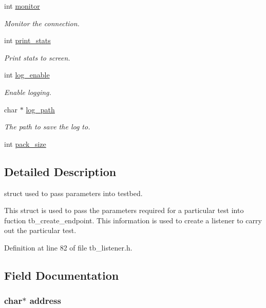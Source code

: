 \begin{DoxyCompactItemize}
int \hyperlink{structtb__test__params__t_a46fa1969de5714507943035793d36269}{monitor}
\begin{DoxyCompactList}\small\item\em Monitor the connection. \end{DoxyCompactList}\item 
int \hyperlink{structtb__test__params__t_a21a0be842e8fa2c780fa87f45bd5d17e}{print\-\_\-stats}
\begin{DoxyCompactList}\small\item\em Print stats to screen. \end{DoxyCompactList}\item 
int \hyperlink{structtb__test__params__t_ac5bfaec8717601161bb642175e1d85e0}{log\-\_\-enable}
\begin{DoxyCompactList}\small\item\em Enable logging. \end{DoxyCompactList}\item 
char $\ast$ \hyperlink{structtb__test__params__t_ac0ddb52991004ce37e7ef093186f44a1}{log\-\_\-path}
\begin{DoxyCompactList}\small\item\em The path to save the log to. \end{DoxyCompactList}\item 
int \hyperlink{structtb__test__params__t_af7112fe07fe05134febc994e10196ce5}{pack\-\_\-size}
\end{DoxyCompactItemize}


\subsection{Detailed Description}
struct used to pass parameters into testbed. 

This struct is used to pass the parameters required for a particular test into fuction tb\-\_\-create\-\_\-endpoint. This information is used to create a listener to carry out the particular test. 

Definition at line 82 of file tb\-\_\-listener.\-h.



\subsection{Field Documentation}
\hypertarget{structtb__test__params__t_a879a8cdf605d02f8af8b2e216b8764f2}{
\subsubsection[{address}]{\setlength{\rightskip}{0pt plus 5cm}char$\ast$ address}}\label{structtb__test__params__t_a879a8cdf605d02f8af8b2e216b8764f2}


